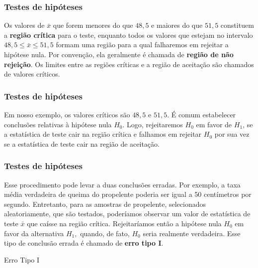 \documentclass[14pt,aspectratio=1610]{beamer}
\begin{document}
\begin{frame}{}
\frametitle{Testes de hipóteses}
\begin{block}{}
\justifying
Os valores de $\bar{x}$ que forem menores do que $48,5$ e maiores do que $51,5$ constituem a \textbf{região crítica} para o teste, enquanto todos os valores que estejam 
no intervalo $48,5 \leq \bar{x}\leq 51,5$ formam uma região para a qual falharemos em rejeitar a hipótese nula. Por convenção, ela geralmente é chamada de 
\textbf{região de não rejeição}. Os limites entre as regiões críticas e a região de aceitação são chamados de valores críticos. 
 \end{block}
\end{frame}

\begin{frame}{}
\frametitle{Testes de hipóteses}
\begin{block}{}
\justifying
Em nosso exemplo, os valores críticos são $48,5$ e $51,5.$ É comum estabelecer conclusões relativas à hipótese nula $H_{0}.$ Logo, rejeitaremos $H_{0}$ em favor 
de $H_{1}$, se a estatística de teste cair na região crítica e falhamos em rejeitar $H_{0}$ por sua vez se a estatística de teste cair na região de aceitação.
 \end{block}
\end{frame}

\begin{frame}{}
\frametitle{Testes de hipóteses}
\begin{block}{}
\justifying
Esse procedimento pode levar a duas conclusões erradas. Por exemplo, a taxa média verdadeira de queima do propelente poderia ser igual a 50 centímetros por segundo. 
Entretanto, para as amostras de propelente, selecionados aleatoriamente, que são testados, poderíamos observar um valor de estatística de teste $\bar{x}$ que 
caísse na região crítica. Rejeitaríamos então a hipótese nula $H_{0}$ em favor da alternativa $H_{1},$ quando, de fato, $H_{0}$ seria realmente verdadeira. Esse tipo de 
conclusão errada é chamado de \textbf{erro tipo I}.
 \end{block}
\pause
\begin{block}{Erro Tipo I}

\end{block}
\end{frame}
\end{document}
